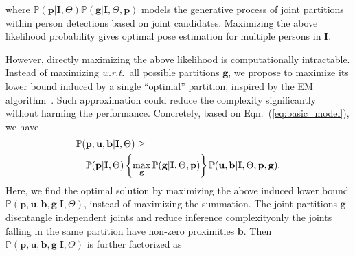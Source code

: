 \documentclass[10pt,twocolumn,letterpaper]{article}
\begin{document}
where $\mathbb{P}(\mathbf{p}|\mathbf{I}, \Theta)\mathbb{P}(\mathbf{g}|\mathbf{I}, \Theta, \mathbf{p})$ models the generative process of joint partitions within person detections based on joint candidates. Maximizing the above likelihood probability  gives optimal pose estimation for multiple persons in  $\mathbf{I}$.

However, directly maximizing the above  likelihood is computationally intractable.  Instead of maximizing \emph{w.r.t.}\ all possible partitions $\mathbf{g}$, we propose to maximize its lower bound
induced by a single ``optimal'' partition, inspired by the EM algorithm~\cite{dempster1977maximum}. Such approximation  could reduce the complexity significantly without harming the performance.
Concretely,  based on Eqn.~(\ref{eq:basic_model}), we have
\begin{equation*}
\begin{aligned}
\mathbb{P}(\mathbf{p}, \mathbf{u}, \mathbf{b} | \mathbf{I}, \Theta) & \geq \\
& \hspace{-18mm} \mathbb{P}(\mathbf{p}|\mathbf{I}, \Theta)\left\{\max_{\mathbf{g}}\mathbb{P}(\mathbf{g}|\mathbf{I}, \Theta, \mathbf{p})\right\}\mathbb{P}(\mathbf{u}, \mathbf{b}|\mathbf{I}, \Theta, \mathbf{p}, \mathbf{g}).
\end{aligned}
\end{equation*}
Here, we find the optimal solution by maximizing the above induced lower bound  $\mathbb{P}(\mathbf{p}, \mathbf{u}, \mathbf{b}, \mathbf{g} | \mathbf{I}, \Theta)$, instead of maximizing the summation.
The joint partitions $\mathbf{g}$ disentangle independent joints and reduce inference complexity\textemdash  only the joints falling in the same partition have non-zero proximities $ \mathbf{b} $. Then $\mathbb{P}(\mathbf{p}, \mathbf{u}, \mathbf{b}, \mathbf{g}| \mathbf{I}, \Theta)$ is further factorized as
\end{document}
